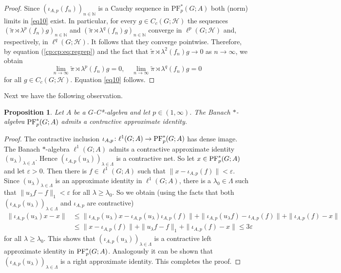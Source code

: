 \documentclass[12pt]{amsart}
\newtheorem{prop}[thm]{Proposition}
\theoremstyle{definition}
\theoremstyle{remark}
\numberwithin{equation}{section}
\newcommand{\N}{\mathbb{N}}
\newcommand{\mc}{\mathcal}
\newcommand{\PF}[3]{\ensuremath{\mathrm{PF}_{#1}^*\left(#2; #3\right)}}
\begin{document}
\begin{proof}
	Since $(\iota_{A,p}(f_n))_{n\in\N}$ is a Cauchy sequence in $\PF{p}{G}{A}$ both (norm) limits in \eqref{eq10} exist. In particular, for every  $g\in C_c(G;\mathcal{H})$ the sequences
	$(\tilde{\pi}\rtimes \lambda^p(f_n) g)_{n\in\N}$ and $(\tilde{\pi}\rtimes \lambda^q(f_n)g)_{n\in\N}$ converge in $\ell^p(G;\mathcal{H})$ and, respectively, in $\ell^q(G;\mathcal{H})$. It follows that they converge pointwise. Therefore, by equation (\ref{cp:cp:eq:regrep}) and
	the fact that $\tilde{\pi}\rtimes \lambda^2(f_n) g\to 0$ as $n\to\infty$, we obtain 
\[
\lim_{n\to\infty} 
\tilde{\pi}\rtimes \lambda^p(f_n) g=0,\quad 
\lim_{n\to\infty}\tilde{\pi}\rtimes \lambda^q(f_n) g=0
\]
for all $g\in C_c(G;\mc{H})$. Equation \eqref{eq10} follows.
\end{proof}

Next we have the following observation.

\begin{prop}\label{prop:approximate}
	Let $A$ be a $G$-C*-algebra and let $p\in(1,\infty)$.  The Banach $*$-algebra
	$\textup{PF}_p^*(G;A)$ admits a contractive approximate identity.
\end{prop}
\begin{proof}
The contractive inclusion
	$\iota_{A,p}\colon \ell^1(G;A) \to \textup{PF}_p^*(G;A)$ has dense image. The Banach $*$-algebra
	$\ell^1(G;A)$ admits a contractive approximate identity $(u_\lambda)_{\lambda\in \Lambda}
 $. Hence $(\iota_{A,p}(u_\lambda))_{\lambda\in \Lambda}$
	is a contractive net. So let $x\in \textup{PF}_p^*(G;A)$ and let
	$\varepsilon>0$. Then there is $f\in \ell^1(G;A)$ such that
	$\| x - \iota_{A,p}(f)\|< \varepsilon$. Since $(u_\lambda)_{\lambda\in \Lambda}$
	is an approximate identity in $\ell^1(G;A)$, there is a $\lambda_0 \in \Lambda$
	such that $\| u_\lambda f - f\|_1 <\varepsilon$ for all $\lambda \geq \lambda_0$. So
	we obtain (using the facts that both $(\iota_{A,p}(u_\lambda))_{\lambda\in \Lambda}$ and $\iota_{A,p}$
	are contractive)
	\begin{align*}
		\| \iota_{A,p}(u_\lambda) x-x \| &\leq \|\iota_{A,p}(u_\lambda)x - \iota_{A,p}(u_\lambda)
		\iota_{A,p}(f) \|+ \| \iota_{A,p}(u_\lambda f) - \iota_{A,p}(f)\|
		+\| \iota_{A,p}(f)- x \|\\
		&\leq\|x - \iota_{A,p}(f)\| + \|u_\lambda f -f \|_1 + \|\iota_{A,p}(f) -x\| \leq 3\varepsilon
	\end{align*}
	for all $\lambda \geq \lambda_0$. This shows that $(\iota_{A,p}(u_\lambda))_{\lambda\in \Lambda}$
	is a contractive left approximate identity in $\textup{PF}_p^*(G;A)$. Analogously it can be shown that
	$(\iota_{A,p}(u_\lambda))_{\lambda\in \Lambda}$ is a right approximate identity. This completes the
	proof.
\end{proof}
\end{document}
